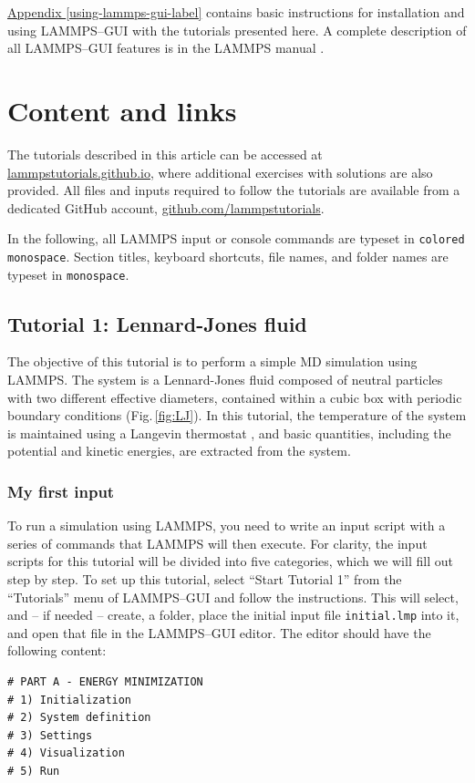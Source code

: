 \documentclass[9pt,tutorial]{livecoms}
\newcommand{\lmpcmd}[1]{\hspace{0pt}\colorbox{listing}{\textcolor{command}{\texttt{#1}}}\hspace{0pt}} %
\newcommand{\flecmd}[1]{\textcolor{command}{\texttt{#1}}} %
\begin{document}
\hyperref[using-lammps-gui-label]{Appendix \ref{using-lammps-gui-label}}
contains basic instructions for installation and using LAMMPS--GUI with
the tutorials presented here.  A complete description of all LAMMPS--GUI
features is in the LAMMPS manual \cite{lammps_gui_docs}.

\section{Content and links}

The tutorials described in this article can be accessed at
\href{https://lammpstutorials.github.io}{lammpstutorials.github.io},
where additional exercises with solutions are also provided. All files
and inputs required to follow the tutorials are available from a
dedicated GitHub account,
\href{https://github.com/lammpstutorials}{github.com/lammpstutorials}.

In the following, all LAMMPS input or console commands are typeset
in \lmpcmd{colored monospace}.  Section titles, keyboard shortcuts,
file names, and folder names are typeset in \flecmd{monospace}.

\subsection{Tutorial 1: Lennard-Jones fluid}
\label{lennard-jones-label}

The objective of this tutorial is to perform a simple MD simulation
using LAMMPS.  The system is a Lennard-Jones fluid composed of neutral
particles with two different effective diameters, contained within a
cubic box with periodic boundary conditions (Fig.\,\ref{fig:LJ}).  In
this tutorial, the temperature of the system is maintained using a
Langevin thermostat \cite{schneider1978molecular}, and basic quantities,
including the potential and kinetic energies, are extracted from the
system.

\subsubsection{My first input}

To run a simulation using LAMMPS, you need to write an input script with
a series of commands that LAMMPS will then execute.  For clarity, the
input scripts for this tutorial will be divided into five categories,
which we will fill out step by step.  To set up this tutorial, select
``Start Tutorial 1'' from the ``Tutorials'' menu of LAMMPS--GUI and
follow the instructions.  This will select, and -- if needed -- create,
a folder, place the initial input file \flecmd{initial.lmp} into it, and
open that file in the LAMMPS--GUI editor.  The editor should have the
following content:
\begin{lstlisting}
# PART A - ENERGY MINIMIZATION
# 1) Initialization
# 2) System definition
# 3) Settings
# 4) Visualization
# 5) Run
\end{lstlisting}
\end{document}
